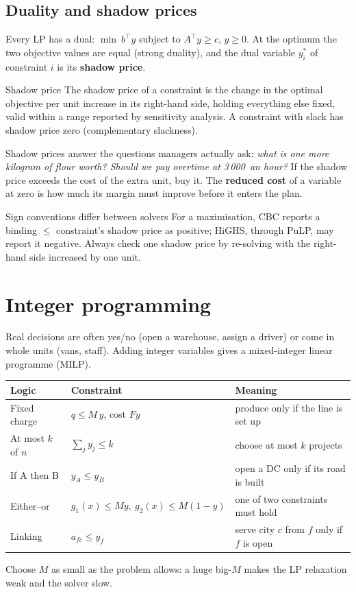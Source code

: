 \subsection{Duality and shadow prices}
Every LP has a dual: $\min\ b^\top y$ subject to $A^\top y\ge c$, $y\ge0$. At the optimum the two objective values are
equal (strong duality), and the dual variable $y_i^*$ of constraint $i$ is its \textbf{shadow price}.

\begin{definition}{Shadow price}
The shadow price of a constraint is the change in the optimal objective per unit increase in its right-hand side,
holding everything else fixed, valid within a range reported by sensitivity analysis. A constraint with slack has
shadow price zero (complementary slackness).
\end{definition}

Shadow prices answer the questions managers actually ask: \emph{what is one more kilogram of flour worth? Should we
pay overtime at 3\,000\xaf\ an hour?} If the shadow price exceeds the cost of the extra unit, buy it. The
\textbf{reduced cost} of a variable at zero is how much its margin must improve before it enters the plan.

\begin{pitfall}{Sign conventions differ between solvers}
For a maximisation, CBC reports a binding $\le$ constraint's shadow price as positive; HiGHS, through PuLP, may
report it negative. Always check one shadow price by re-solving with the right-hand side increased by one unit.
\end{pitfall}

\section{Integer programming}
Real decisions are often yes/no (open a warehouse, assign a driver) or come in whole units (vans, staff). Adding
integer variables gives a mixed-integer linear programme (MILP).

\begin{center}\small
\begin{tabularx}{\linewidth}{@{}L{4.0cm}L{5.0cm}Y@{}}
\toprule
\textbf{Logic} & \textbf{Constraint} & \textbf{Meaning}\\\midrule
Fixed charge & $q\le M\,y$, cost $F y$ & produce only if the line is set up\\
At most $k$ of $n$ & $\sum_j y_j\le k$ & choose at most $k$ projects\\
If A then B & $y_A\le y_B$ & open a DC only if its road is built\\
Either--or & $g_1(x)\le M y,\ g_2(x)\le M(1-y)$ & one of two constraints must hold\\
Linking & $a_{fc}\le y_f$ & serve city $c$ from $f$ only if $f$ is open\\\bottomrule
\end{tabularx}
\end{center}
Choose $M$ as small as the problem allows: a huge big-$M$ makes the LP relaxation weak and the solver slow.

